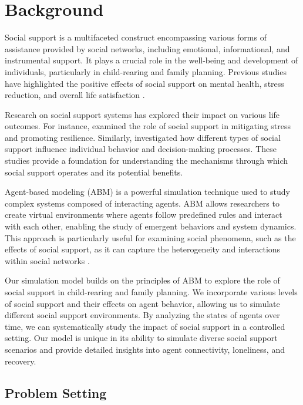\documentclass{article} %
\begin{document}
\section{Background}
\label{sec:background}

Social support is a multifaceted construct encompassing various forms of assistance provided by social networks, including emotional, informational, and instrumental support. It plays a crucial role in the well-being and development of individuals, particularly in child-rearing and family planning. Previous studies have highlighted the positive effects of social support on mental health, stress reduction, and overall life satisfaction \citep{park2023generative}.

Research on social support systems has explored their impact on various life outcomes. For instance, \citet{shanahan2023role} examined the role of social support in mitigating stress and promoting resilience. Similarly, \citet{wang2023describe} investigated how different types of social support influence individual behavior and decision-making processes. These studies provide a foundation for understanding the mechanisms through which social support operates and its potential benefits.

Agent-based modeling (ABM) is a powerful simulation technique used to study complex systems composed of interacting agents. ABM allows researchers to create virtual environments where agents follow predefined rules and interact with each other, enabling the study of emergent behaviors and system dynamics. This approach is particularly useful for examining social phenomena, such as the effects of social support, as it can capture the heterogeneity and interactions within social networks \citep{liu2023agentbench}.

Our simulation model builds on the principles of ABM to explore the role of social support in child-rearing and family planning. We incorporate various levels of social support and their effects on agent behavior, allowing us to simulate different social support environments. By analyzing the states of agents over time, we can systematically study the impact of social support in a controlled setting. Our model is unique in its ability to simulate diverse social support scenarios and provide detailed insights into agent connectivity, loneliness, and recovery.

\subsection{Problem Setting}
\label{sec:problem_setting}
\end{document}
